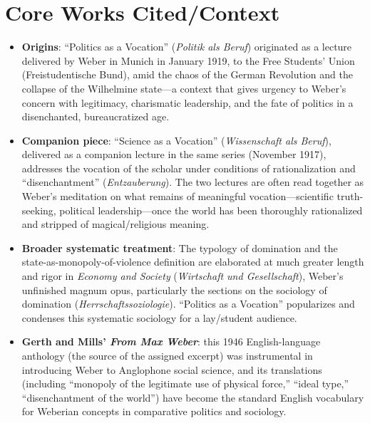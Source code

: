 \documentclass[12pt]{article}
\begin{document}
\section{Core Works Cited/Context}

\begin{itemize}[leftmargin=*, itemsep=4pt]
    \item \textbf{Origins}: ``Politics as a Vocation'' (\textit{Politik als Beruf}) originated as a lecture delivered by Weber in Munich in January 1919, to the Free Students' Union (Freistudentische Bund), amid the chaos of the German Revolution and the collapse of the Wilhelmine state---a context that gives urgency to Weber's concern with legitimacy, charismatic leadership, and the fate of politics in a disenchanted, bureaucratized age.
    \item \textbf{Companion piece}: ``Science as a Vocation'' (\textit{Wissenschaft als Beruf}), delivered as a companion lecture in the same series (November 1917), addresses the vocation of the scholar under conditions of rationalization and ``disenchantment'' (\textit{Entzauberung}). The two lectures are often read together as Weber's meditation on what remains of meaningful vocation---scientific truth-seeking, political leadership---once the world has been thoroughly rationalized and stripped of magical/religious meaning.
    \item \textbf{Broader systematic treatment}: The typology of domination and the state-as-monopoly-of-violence definition are elaborated at much greater length and rigor in \textit{Economy and Society} (\textit{Wirtschaft und Gesellschaft}), Weber's unfinished magnum opus, particularly the sections on the sociology of domination (\textit{Herrschaftssoziologie}). ``Politics as a Vocation'' popularizes and condenses this systematic sociology for a lay/student audience.
    \item \textbf{Gerth and Mills' \textit{From Max Weber}}: this 1946 English-language anthology (the source of the assigned excerpt) was instrumental in introducing Weber to Anglophone social science, and its translations (including ``monopoly of the legitimate use of physical force,'' ``ideal type,'' ``disenchantment of the world'') have become the standard English vocabulary for Weberian concepts in comparative politics and sociology.
\end{itemize}

\end{document}
